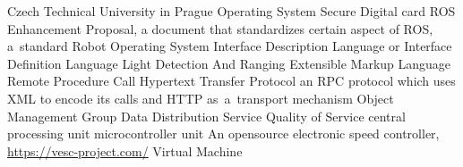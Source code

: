     {Czech Technical University in Prague}
      {Operating System}
 {Secure Digital card}
     {ROS Enhancement Proposal, a document that standardizes certain aspect of ROS, a~standard}
     {Robot Operating System}
     {Interface Description Language or Interface Definition Language}
   {Light Detection And Ranging}
     {Extensible Markup Language}
     {Remote Procedure Call}
    {Hypertext Transfer Protocol}
 {an RPC protocol which uses XML to encode its calls and HTTP as~a~transport mechanism}
     {Object Management Group}
     {Data Distribution Service}
     {Quality of Service}
     {central processing unit}
     {microcontroller unit}
    {An opensource electronic speed controller, \url{https://vesc-project.com/}}
      {Virtual Machine}

